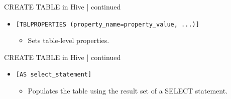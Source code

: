  \begin{frame}{CREATE TABLE in Hive | continued}
	\begin{tcolorbox}[colback=white,colframe=black,title= Part 9: Table Properties]
		\small
	\begin{itemize}
	  \item \texttt{[TBLPROPERTIES (property\_name=property\_value, ...)]}
	  \begin{itemize}
		\item Sets table-level properties.
	  \end{itemize}
	\end{itemize}
	\end{tcolorbox}
  \end{frame}
  
  \begin{frame}{CREATE TABLE in Hive | continued}
	\begin{tcolorbox}[colback=white,colframe=black,title= Part 10: CTAS]
		\small
	\begin{itemize}
	  \item \texttt{[AS select\_statement]}
	  \begin{itemize}
		\item Populates the table using the result set of a SELECT statement.
	  \end{itemize}
	\end{itemize}
	\end{tcolorbox}
  \end{frame}
   












































